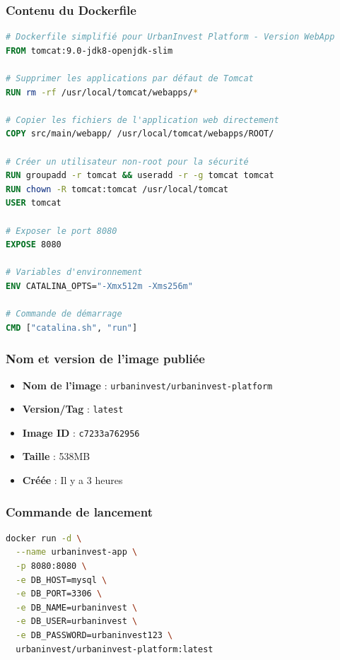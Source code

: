 \documentclass[12pt,a4paper]{article}
\begin{document}
\subsubsection{Contenu du Dockerfile}
\begin{lstlisting}[language=Dockerfile, caption=Dockerfile UrbanInvest]
# Dockerfile simplifié pour UrbanInvest Platform - Version WebApp
FROM tomcat:9.0-jdk8-openjdk-slim

# Supprimer les applications par défaut de Tomcat
RUN rm -rf /usr/local/tomcat/webapps/*

# Copier les fichiers de l'application web directement
COPY src/main/webapp/ /usr/local/tomcat/webapps/ROOT/

# Créer un utilisateur non-root pour la sécurité
RUN groupadd -r tomcat && useradd -r -g tomcat tomcat
RUN chown -R tomcat:tomcat /usr/local/tomcat
USER tomcat

# Exposer le port 8080
EXPOSE 8080

# Variables d'environnement
ENV CATALINA_OPTS="-Xmx512m -Xms256m"

# Commande de démarrage
CMD ["catalina.sh", "run"]
\end{lstlisting}

\subsubsection{Nom et version de l'image publiée}
\begin{itemize}
    \item \textbf{Nom de l'image} : \texttt{urbaninvest/urbaninvest-platform}
    \item \textbf{Version/Tag} : \texttt{latest}
    \item \textbf{Image ID} : \texttt{c7233a762956}
    \item \textbf{Taille} : 538MB
    \item \textbf{Créée} : Il y a 3 heures
\end{itemize}

\subsubsection{Commande de lancement}
\begin{lstlisting}[language=bash, caption=Commande de lancement Docker]
docker run -d \
  --name urbaninvest-app \
  -p 8080:8080 \
  -e DB_HOST=mysql \
  -e DB_PORT=3306 \
  -e DB_NAME=urbaninvest \
  -e DB_USER=urbaninvest \
  -e DB_PASSWORD=urbaninvest123 \
  urbaninvest/urbaninvest-platform:latest
\end{lstlisting}
\end{document}
